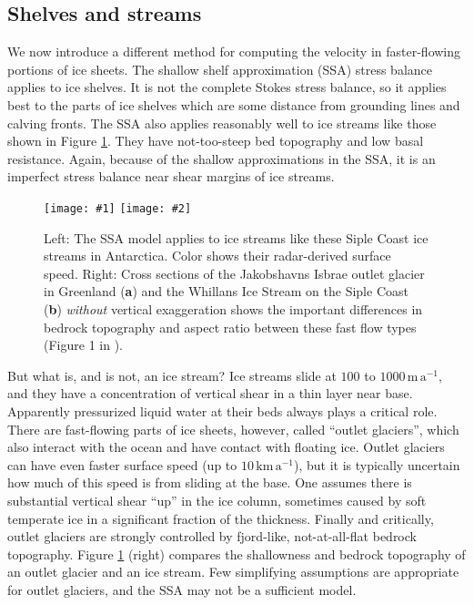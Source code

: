 \documentclass[titlepage,a4paper,final,12pt]{scrartcl}
\newcommand{\twofigsizes}[5]{
\begin{figure}[ht]
\centering
\texttt{[image: \#1]} \quad
\texttt{[image: \#2]}
\caption{#3}
\label{fig:#1}
\end{figure}}
\begin{document}
\subsection{Shelves and streams} \label{sec:shelvesandstreams}

We now introduce a different method for computing the velocity in faster-flowing portions of ice sheets.  The shallow shelf approximation (SSA) stress balance applies to ice shelves.  It is not the complete Stokes stress balance, so it applies best to the parts of ice shelves which are some distance from grounding lines and calving fronts.  The SSA also applies reasonably well to ice streams like those shown in Figure \ref{fig:siple}.  They have not-too-steep bed topography and low basal resistance.  Again, because of the shallow approximations in the SSA, it is an imperfect stress balance near shear margins of ice streams.

\twofigsizes{siple}{streamisbrae}{Left:  The SSA model applies to ice streams like these Siple Coast ice streams in Antarctica.  Color shows their radar-derived surface speed.  Right: Cross sections of the Jakobshavns Isbrae outlet glacier in Greenland (\textbf{a}) and the Whillans Ice Stream on the Siple Coast (\textbf{b}) \emph{without} vertical exaggeration shows the important differences in bedrock topography and aspect ratio between these fast flow types (Figure 1 in \cite{TrufferEchelmeyer}).}{2.8in}{2.9in}

But what is, and is not, an ice stream?  Ice streams slide at $100$ to $1000 \,\text{m}\,\text{a}^{-1}$, and they have a concentration of vertical shear in a thin layer near base.  Apparently pressurized liquid water at their beds always plays a critical role.  There are fast-flowing parts of ice sheets, however, called ``outlet glaciers'', which also interact with the ocean and have contact with floating ice.  Outlet glaciers can have even faster surface speed (up to $10 \,\text{km}\,\text{a}^{-1}$), but it is typically uncertain how much of this speed is from sliding at the base.  One assumes there is substantial vertical shear ``up'' in the ice column, sometimes caused by soft temperate ice in a significant fraction of the thickness.  Finally and critically, outlet glaciers are strongly controlled by fjord-like, not-at-all-flat bedrock topography.  Figure \ref{fig:siple} (right) compares the shallowness and bedrock topography of an outlet glacier and an ice stream.  Few simplifying assumptions are appropriate for outlet glaciers, and the SSA may not be a sufficient model.
\end{document}
